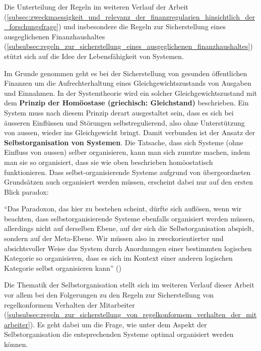\documentclass[10pt]{article}
\begin{document}
\begin{shaded}
Die Unterteilung der Regeln im weiteren Verlauf der Arbeit (\vref{subsec:zweckmaessigkeit_und_relevanz_der_finanzregularien_hinsichtlich_der_forschungsfrage}) und insbesondere die Regeln zur Sicherstellung eines ausgeglichenen Finanzhaushaltes (\vref{subsubsec:regeln_zur_sicherstellung_eines_ausgeglichenen_finanzhaushaltes}) stützt sich auf die Idee der Lebensfähigkeit von Systemen.

\end{shaded}
Im Grunde genommen geht es bei der Sicherstellung von gesunden öffentlichen Finanzen um die Aufrechterhaltung eines Gleichgewichtszustands von Ausgaben und Einnahmen. In der Systemtheorie wird ein solcher Gleichgewichtszustand mit dem \textbf{Prinzip der Homöostase (griechisch: Gleichstand)} beschrieben. Ein System muss nach diesem Prinzip derart ausgestaltet sein, dass es sich bei äusseren Einflüssen und Störungen selbstregulierend,  also ohne Unterstützung von aussen, wieder ins Gleichgewicht bringt. Damit verbunden ist der Ansatz der \textbf{Selbstorganisation von Systemen}. Die Tatsache, dass sich Systeme (ohne Einfluss von aussen) selber organisieren, kann man sich zunutze machen, indem man sie so organisiert, dass sie wie oben beschrieben homöostatisch funktionieren. Dass selbst-organisierende Systeme aufgrund von übergeordneten Grundsätzen auch organisiert werden müssen, erscheint dabei nur auf den ersten Blick paradox:

“{}Das Paradoxon, das hier zu bestehen scheint, dürfte sich auflösen, wenn wir beachten, dass selbstorganisierende Systeme ebenfalls organisiert werden müssen, allerdings nicht auf derselben Ebene, auf der sich die Selbstorganisation abspielt, sondern auf der Meta-Ebene. Wir müssen also in zweckorientierter und absichtsvoller Weise das System durch Anordnungen einer bestimmten logischen Kategorie so organisieren, dass es sich im Kontext einer anderen logischen Kategorie selbst organisieren kann”{} (\cite[S. 318]{Malik2008})

Die Thematik der Selbstorganisation stellt sich im weiteren Verlauf dieser Arbeit vor allem bei den Folgerungen zu den Regeln zur Sicherstellung von regelkonformem Verhalten der Mitarbeiter (\vref{subsubsec:regeln_zur_sicherstellung_von_regelkonformem_verhalten_der_mitarbeiter}). Es geht dabei um die Frage, wie unter dem Aspekt der Selbstorganisation die entsprechenden Systeme optimal organisiert werden können.
\end{document}

